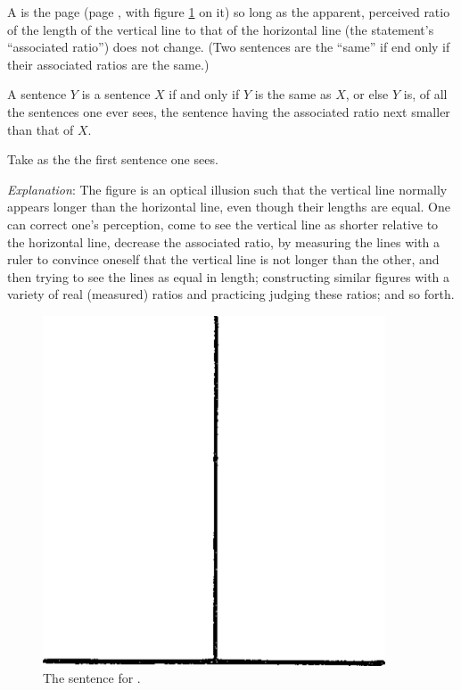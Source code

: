 \begin{sysrules}
A  is the page (page \pageref{illusions}, with figure \ref{illusions} on it) so long as the 
apparent, perceived ratio of the length of the vertical line to that 
of the horizontal line (the statement's \enquote{associated ratio}) does not 
change. (Two sentences are the \enquote{same} if end only if their 
associated ratios are the same.) 

A sentence $Y$ is  a sentence $X$ if and only if $Y$ is the same as $X$, 
or else $Y$ is, of all the sentences one ever sees, the sentence having 
the associated ratio next smaller than that of $X$. 

Take as the  the first sentence one sees. 

\emph{Explanation}: The figure is an optical illusion such that the vertical line 
normally appears longer than the horizontal line, even though their 
lengths are equal. One can correct one's perception, come to see 
the vertical line as shorter relative to the horizontal line, decrease 
the associated ratio, by measuring the lines with a ruler to convince 
oneself that the vertical line is not longer than the other, and then 
trying to see the lines as equal in length; constructing similar 
figures with a variety of real (measured) ratios and practicing 
judging these ratios; and so forth. 
\end{sysrules}

\begin{figure}[p]
	{\centering \includegraphics[width=4in]{img/illusions} \par}
	\caption{The sentence for .}
	\label{illusions}
\end{figure}

